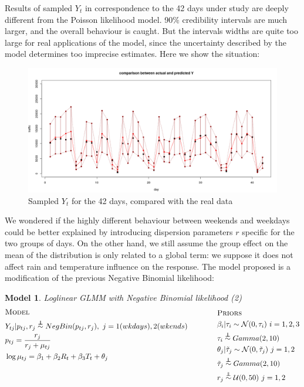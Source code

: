 \documentclass[11pt,twoside]{report}
\newcommand\independent{\protect\mathpalette{\protect\independenT}{\perp}}
\def\independenT#1#2{\mathrel{\rlap{$#1#2$}\mkern2mu{#1#2}}}
\newtheorem{model}{Model}
\begin{document}
Results of sampled $Y_t$ in correspondence to the 42 days under study are deeply different from the Poisson likelihood model. 90$\%$ credibility intervals are much larger, and the overall behaviour is caught. But the intervals widths are quite too large for real applications of the model, since the uncertainty described by the model determines too imprecise estimates. Here we show the situation:
\begin{figure}[H]
	\centering
	\includegraphics[width=160 mm]{pictures/negbin_single_r_pred.png}
	\caption{Sampled $Y_t$ for the 42 days, compared with the real data}
	\label{fig:nb_pred}
\end{figure}
We wondered if the highly different behaviour between weekends and weekdays could be better explained by introducing dispersion parameters $r$ specific for the two groups of days. On the other hand, we still assume the group effect on the mean of the distribution is only related to a global term: we suppose it does not affect rain and temperature influence on the response. The model proposed is a modification of the previous Negative Binomial likelihood:
\begin{model} Loglinear GLMM with Negative Binomial likelihood (2)\\
	\begin{equation*}
	\begin{aligned}
	&\textsc{Model}\\
	&Y_{tj}  |  p_{tj},r_j \overset{\independent}{\sim} NegBin(p_{tj},r_j), \ j = 1 (wkdays), 2 (wkends)\\
	&p_{tj} = \frac{r_j}{r_j+\mu_{tj}}\\
	&\log{\mu_{tj}} = \beta_1 + \beta_2R_{t} + \beta_3T_{t} + \theta_j\\
	&\\
	&\\
	\end{aligned}
	\qquad \qquad
	\begin{aligned}[c]
	&\textsc{Priors}\\
	&\beta_i | \tau_i \sim \mathcal{N}(0, \tau_i) \ i = 1,2,3\\
	&\tau_i \overset{\independent}{\sim} Gamma(2,10) \\
	&\theta_j | \tilde{\tau}_j \sim \mathcal{N}(0, \tilde{\tau}_j) \ j = 1,2\\
	&\tilde{\tau}_j \overset{\independent}{\sim} Gamma(2,10)\\
	&r_j \overset{\independent}{\sim}\mathcal{U}(0,50) \ j = 1,2
	\end{aligned}
\end{equation*}
	\end{model}
\end{document}
